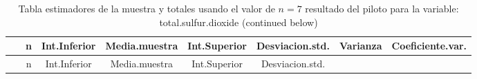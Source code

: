 \documentclass[
]{article}
\begin{document}
\begin{longtable}[]{@{}cccccccc@{}}
\caption{Tabla estimadores de la muestra y totales usando el valor de
\(n = 7\) resultado del piloto para la variable: total.sulfur.dioxide
(continued below)}\tabularnewline
\toprule
\begin{minipage}[b]{0.17\columnwidth}\centering
~\strut
\end{minipage} & \begin{minipage}[b]{0.02\columnwidth}\centering
n\strut
\end{minipage} & \begin{minipage}[b]{0.09\columnwidth}\centering
Int.Inferior\strut
\end{minipage} & \begin{minipage}[b]{0.10\columnwidth}\centering
Media.muestra\strut
\end{minipage} & \begin{minipage}[b]{0.09\columnwidth}\centering
Int.Superior\strut
\end{minipage} & \begin{minipage}[b]{0.11\columnwidth}\centering
Desviacion.std.\strut
\end{minipage} & \begin{minipage}[b]{0.07\columnwidth}\centering
Varianza\strut
\end{minipage} & \begin{minipage}[b]{0.12\columnwidth}\centering
Coeficiente.var.\strut
\end{minipage}\tabularnewline
\midrule
\endfirsthead
\toprule
\begin{minipage}[b]{0.17\columnwidth}\centering
~\strut
\end{minipage} & \begin{minipage}[b]{0.02\columnwidth}\centering
n\strut
\end{minipage} & \begin{minipage}[b]{0.09\columnwidth}\centering
Int.Inferior\strut
\end{minipage} & \begin{minipage}[b]{0.10\columnwidth}\centering
Media.muestra\strut
\end{minipage} & \begin{minipage}[b]{0.09\columnwidth}\centering
Int.Superior\strut
\end{minipage} & \begin{minipage}[b]{0.11\columnwidth}\centering
Desviacion.std.\strut
\end{minipage} & \begin{minipage}[b]{0.07\columnwidth}\centering

\end{minipage}
\end{longtable}
\end{document}
